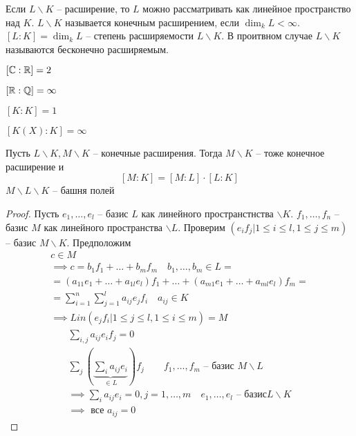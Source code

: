 \documentclass[main]{subfiles}
\begin{document}
Если $L \backslash K$ -- расширение, то $L$ можно рассматривать как линейное пространство над $K$.
$L \backslash K$ называется конечным расширением, если $\dim_k L < \infty$. 
$[L:K] = \dim_k L $ -- степень расширяемости $L \backslash K$. В проитвном случае
$L \backslash K$ называются бесконечно расширяемым.

\begin{example}
    $[\mathbb{C}:\mathbb{R}] = 2$
\end{example}
\begin{example}
    $[\mathbb{R} : \mathbb{Q} ] = \infty$
\end{example}
\begin{example}
    $ [K:K] = 1$
\end{example}
\begin{example}
    $[K(X):K]= \infty $ 
\end{example}

\begin{proposition}
    Пусть $L \backslash K, M \backslash K$ -- конечные расширения. Тогда $M \backslash K$ -- тоже
    конечное расширение и 
    \[ [M:K] = [M:L] \cdot [L:K] \] 
    $M \backslash L \backslash K $ -- башня полей
\end{proposition}

\begin{proof}
    Пусть $e_1, \ldots , e_l $ -- базис $L$ как линейного пространстнства $\backslash K$.
    $f_1, \ldots , f_n$ -- базис $M$ как линейного пространства $\backslash L$. Проверим 
    $(e_i f_j | 1 \leq i \leq l, 1 \leq j \leq m)$ -- базис $M \backslash K$. Предположим
    \begin{multline*}
        c \in M \\
        \implies c = b_1f_1 + \ldots + b_mf_m \quad b_1, \ldots, b_m \in L = \\
        = (a_{11}e_1 + \ldots + a_{1l}e_l)f_1 + \ldots + (a_{m1}e_1 + \ldots + a_{ml}e_l)f_m = \\
        = \sum^n_{i=1} \sum^l_{j=1} a_{ij}e_jf_i \quad a_{ij} \in K \\
        \implies Lin(e_jf_i | 1 \leq j \leq l, 1 \leq i \leq m) = M  
    \end{multline*}
    \begin{gather*}
         \sum_{i,j} a_{ij} e_if_j = 0 \\
         \sum_{j} \left( \underbrace{\sum_{i} a_{ij} e_i}_{\in L} \right) f_j \quad \quad 
         f_1, \ldots, f_m \text{ -- базис } M \backslash L \\
         \implies \sum_i a_{ij}  e_i = 0, j = 1, \ldots, m \quad e_1, \ldots, e_l \text{ -- базис} L \backslash K \\
         \implies \text{ все } a_{ij} = 0
    \end{gather*}
\end{proof}
\end{document}
